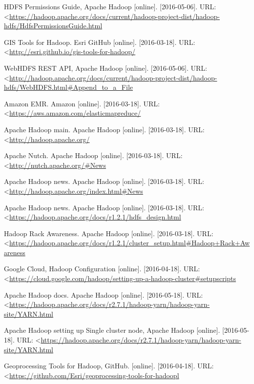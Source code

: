 \documentclass[a4paper,12pt,oneside]{report}
\begin{document}
\begin{thebibliography}{99}
HDFS Permissions Guide, Apache Hadoop  [online]. [2016-05-06]. URL:  \textless\url{https://hadoop.apache.org/docs/current/hadoop-project-dist/hadoop-hdfs/HdfsPermissionsGuide.html}

GIS Tools for Hadoop. Esri GitHub [online]. [2016-03-18]. URL:  \textless\url{http://esri.github.io/gis-tools-for-hadoop/}

WebHDFS REST API, Apache Hadoop  [online]. [2016-05-06]. URL:  \textless\url{http://hadoop.apache.org/docs/current/hadoop-project-dist/hadoop-hdfs/WebHDFS.html#Append_to_a_File
}

Amazon EMR. Amazon [online]. [2016-03-18]. 
URL: \textless\url{https://aws.amazon.com/elasticmapreduce/}

Apache Hadoop main. Apache Hadoop [online]. [2016-03-18]. 
URL: \textless\url{http://hadoop.apache.org/}

Apache Nutch. Apache Hadoop [online]. [2016-03-18]. 
URL: \textless\url{http://nutch.apache.org/#News
}

Apache Hadoop news. Apache Hadoop [online]. [2016-03-18]. 
URL: \textless\url{http://hadoop.apache.org/index.html#News}


Apache Hadoop news. Apache Hadoop [online]. [2016-03-18]. 
URL: \textless\url{https://hadoop.apache.org/docs/r1.2.1/hdfs_design.html}


Hadoop Rack Awareness. Apache Hadoop [online]. [2016-03-18]. 
URL: \textless\url{https://hadoop.apache.org/docs/r1.2.1/cluster_setup.html#Hadoop+Rack+Awareness}

Google Cloud, Hadoop Configuration [online]. [2016-04-18]. 
URL: \textless\url{https://cloud.google.com/hadoop/setting-up-a-hadoop-cluster#setupscripts}

Apache Hadoop docs. Apache Hadoop [online]. [2016-05-18]. 
URL: \textless\url{https://hadoop.apache.org/docs/r2.7.1/hadoop-yarn/hadoop-yarn-site/YARN.html}

Apache Hadoop setting up Single cluster node, Apache Hadoop [online]. [2016-05-18]. 
URL: \textless\url{https://hadoop.apache.org/docs/r2.7.1/hadoop-yarn/hadoop-yarn-site/YARN.html}


Geoprocessing Tools for Hadoop, GitHub. [online]. [2016-04-18]. 
URL: \textless\url{https://github.com/Esri/geoprocessing-tools-for-hadoopl}


\end{thebibliography}
\end{document}
